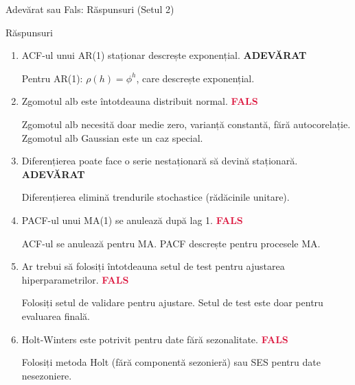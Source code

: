 \documentclass[9pt, aspectratio=169, t]{beamer}
\begin{document}
\begin{frame}{Adevărat sau Fals: Răspunsuri (Setul 2)}
    \begin{exampleblock}{Răspunsuri}
    \begin{enumerate}
        \item ACF-ul unui AR(1) staționar descrește exponențial. \hfill \textbf{\textcolor{Forest}{ADEVĂRAT}}

        {\small \textcolor{MediumGray}{Pentru AR(1): $\rho(h) = \phi^h$, care descrește exponențial.}}

        \vspace{0.15cm}

        \item Zgomotul alb este întotdeauna distribuit normal. \hfill \textbf{\textcolor{Crimson}{FALS}}

        {\small \textcolor{MediumGray}{Zgomotul alb necesită doar medie zero, varianță constantă, fără autocorelație. Zgomotul alb Gaussian este un caz special.}}

        \vspace{0.15cm}

        \item Diferențierea poate face o serie nestaționară să devină staționară. \hfill \textbf{\textcolor{Forest}{ADEVĂRAT}}

        {\small \textcolor{MediumGray}{Diferențierea elimină trendurile stochastice (rădăcinile unitare).}}

        \vspace{0.15cm}

        \item PACF-ul unui MA(1) se anulează după lag 1. \hfill \textbf{\textcolor{Crimson}{FALS}}

        {\small \textcolor{MediumGray}{ACF-ul se anulează pentru MA. PACF descrește pentru procesele MA.}}

        \vspace{0.15cm}

        \item Ar trebui să folosiți întotdeauna setul de test pentru ajustarea hiperparametrilor. \hfill \textbf{\textcolor{Crimson}{FALS}}

        {\small \textcolor{MediumGray}{Folosiți setul de validare pentru ajustare. Setul de test este doar pentru evaluarea finală.}}

        \vspace{0.15cm}

        \item Holt-Winters este potrivit pentru date fără sezonalitate. \hfill \textbf{\textcolor{Crimson}{FALS}}

        {\small \textcolor{MediumGray}{Folosiți metoda Holt (fără componentă sezonieră) sau SES pentru date nesezoniere.}}
    \end{enumerate}
    \end{exampleblock}
\end{frame}
\end{document}
